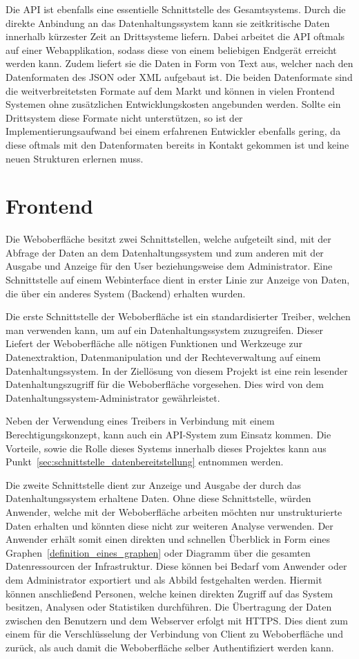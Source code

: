 Die API ist ebenfalls eine essentielle Schnittstelle des Gesamtsystems. Durch
die direkte Anbindung an das Datenhaltungssystem kann sie zeitkritische Daten
innerhalb kürzester Zeit an Drittsysteme liefern. Dabei arbeitet die API
oftmals auf einer Webapplikation, sodass diese von einem beliebigen Endgerät
erreicht werden kann. Zudem liefert sie die Daten in Form von Text aus, welcher
nach den Datenformaten des \gls{JSON} oder \gls{XML} aufgebaut ist. Die beiden
Datenformate sind die weitverbreitetsten Formate auf dem Markt und können in
vielen Frontend Systemen ohne zusätzlichen Entwicklungskosten angebunden
werden.  Sollte ein Drittsystem diese Formate nicht unterstützen, so ist der
Implementierungsaufwand bei einem erfahrenen Entwickler ebenfalls gering, da
diese oftmals mit den Datenformaten bereits in Kontakt gekommen ist und keine
neuen Strukturen erlernen muss.
\nl%

\section{Frontend}
Die Weboberfläche besitzt zwei Schnittstellen, welche aufgeteilt sind, mit der
Abfrage der Daten an dem Datenhaltungssystem und zum anderen mit der Ausgabe
und Anzeige für den User beziehungsweise dem Administrator. Eine Schnittstelle
auf einem Webinterface dient in erster Linie zur Anzeige von Daten, die über
ein anderes System (Backend) erhalten wurden.

Die erste Schnittstelle der Weboberfläche ist ein standardisierter Treiber,
welchen man verwenden kann, um auf ein Datenhaltungssystem zuzugreifen. Dieser
Liefert der Weboberfläche alle nötigen Funktionen und Werkzeuge zur
Datenextraktion, Datenmanipulation und der Rechteverwaltung auf einem
Datenhaltungssystem. In der Ziellösung von diesem Projekt ist eine rein
lesender Datenhaltungszugriff für die Weboberfläche vorgesehen. Dies wird von
dem Datenhaltungssystem-Administrator gewährleistet.

Neben der Verwendung eines Treibers in Verbindung mit einem
Berechtigungskonzept, kann auch ein API-System zum Einsatz kommen. Die
Vorteile, sowie die Rolle dieses Systems innerhalb dieses Projektes kann aus
Punkt~\ref{sec:schnittstelle_datenbereitstellung} entnommen werden.

Die zweite Schnittstelle dient zur Anzeige und Ausgabe der durch das
Datenhaltungssystem erhaltene Daten. Ohne diese Schnittstelle, würden Anwender,
welche mit der Weboberfläche arbeiten möchten nur unstrukturierte Daten
erhalten und könnten diese nicht zur weiteren Analyse verwenden. Der Anwender
erhält somit einen direkten und schnellen Überblick in Form eines
Graphen~\ref{definition_eines_graphen} oder Diagramm über die gesamten
Datenressourcen der Infrastruktur. Diese können bei Bedarf vom Anwender oder
dem Administrator exportiert und als Abbild festgehalten werden. Hiermit können
anschließend Personen, welche keinen direkten Zugriff auf das System besitzen,
Analysen oder Statistiken durchführen. Die Übertragung der Daten zwischen den
Benutzern und dem Webserver erfolgt mit \gls{HTTPS}. Dies dient zum einem für
die Verschlüsselung der Verbindung von Client zu Weboberfläche und zurück, als
auch damit die Weboberfläche selber Authentifiziert werden kann.
\mr%

